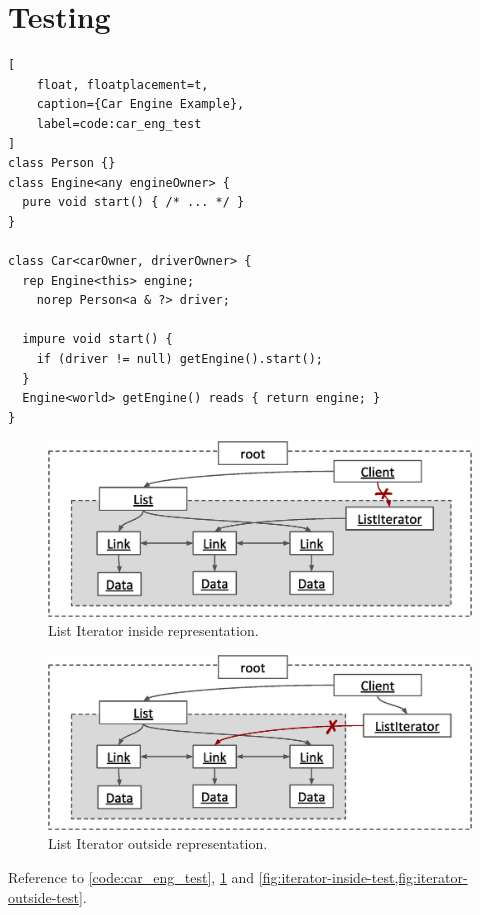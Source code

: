 \documentclass{acm_proc_article-sp}
\begin{document}
\section{Testing}
\label{sec:test}

\begin{lstlisting}[
	float, floatplacement=t,
	caption={Car Engine Example},
	label=code:car_eng_test
]
class Person {}
class Engine<any engineOwner> {
  pure void start() { /* ... */ }
}

class Car<carOwner, driverOwner> {
  rep Engine<this> engine;
	norep Person<a & ?> driver;

  impure void start() {
    if (driver != null) getEngine().start();
  }
  Engine<world> getEngine() reads { return engine; }
}
\end{lstlisting}

\begin{figure}[t]
\centering
\includegraphics{iterator-fail-inside.eps}
\caption{List Iterator inside representation.}
\label{fig:iterator-inside-test}
\end{figure}

\begin{figure}[t]
\centering
\includegraphics{iterator-fail-outside.eps}
\caption{List Iterator outside representation.}
\label{fig:iterator-outside-test}
\end{figure}

Reference to \cref{code:car_eng_test}, \cref{sec:test} and
\cref{fig:iterator-inside-test,fig:iterator-outside-test}.
\end{document}
